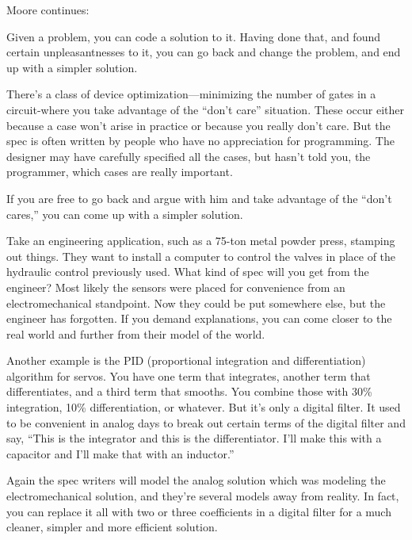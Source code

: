 \bigskip\blackline{2ex}
\noindent Moore continues:
\begin{tfquot}

Given a problem, you can code a solution to it. Having done that, and found
certain unpleasantnesses to it, you can go back and change the problem,
and end up with a simpler solution.

There's a class of device optimization---minimizing the number of gates in a
circuit-where you take advantage of the ``don't care'' situation. These
occur either because a case won't arise in practice or because you really
don't care. But the spec is often written by people who have no appreciation
for programming. The designer may have carefully specified all the cases,
but hasn't told you, the programmer, which cases are really important.

If you are free to go back and argue with him and take advantage of the
``don't cares,'' you can come up with a simpler solution.

Take an engineering application, such as a 75-ton metal powder press,
stamping out things. They want to install a computer to control the valves
in place of the hydraulic control previously used. What kind of spec will you
get from the engineer? Most likely the sensors were placed for convenience
from an electromechanical standpoint. Now they could be put somewhere
else, but the engineer has forgotten. If you demand explanations, you can
come closer to the real world and further from their model of the world.

Another example is the PID (proportional integration and differentiation)
algorithm for servos. You have one term that integrates, another term that
differentiates, and a third term that smooths. You combine those with
30\% integration, 10\% differentiation, or whatever. But it's only a digital
filter. It used to be convenient in analog days to break out certain terms of
the digital filter and say, ``This is the integrator and this is the
differentiator. I'll make this with a capacitor and I'll make that with an inductor.''

Again the spec writers will model the analog solution which was modeling
the electromechanical solution, and they're several models away from
reality. In fact, you can replace it all with two or three coefficients in a digital
filter for a much cleaner, simpler and more efficient solution.
\end{tfquot}
\blackline{2ex}

